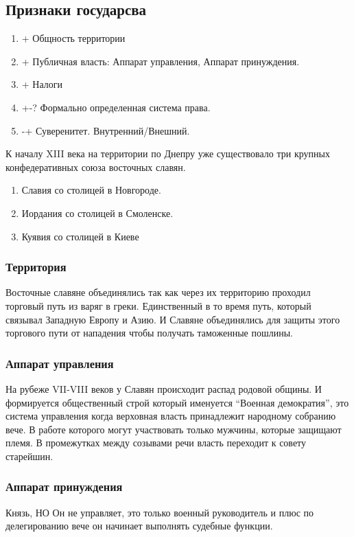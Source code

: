 \documentclass[a4paper]{article}
\begin{document}
\subsection{Признаки государсва}
\begin{enumerate}
    \item + Общность территории
    \item + Публичная власть: Аппарат управления, Аппарат принуждения.
    \item + Налоги
    \item +-? Формально определенная система права.
    \item -+ Суверенитет. Внутренний/Внешний.
\end{enumerate}

К началу XIII века на территории по Днепру уже существовало три крупных конфедеративных союза восточных славян. 
\begin{enumerate}
    \item Славия со столицей в Новгороде. 
    \item Иордания со столицей в Смоленске. 
    \item Куявия со столицей в Киеве
\end{enumerate}

\subsubsection{Территория}
Восточные славяне объединялись так как через их территорию проходил торговый путь из варяг в греки. Единственный в то время путь, который связывал Западную Европу и Азию. И Славяне объединялись для защиты этого торгового пути от нападения чтобы получать таможенные пошлины.

\subsubsection{Аппарат управления}
На рубеже VII-VIII веков у Славян происходит распад родовой общины. И формируется общественный строй который именуется ``Военная демократия'', это система управления когда верховная власть принадлежит народному собранию вече. В работе которого могут участвовать только мужчины, которые защищают племя. В промежутках между созывами речи власть переходит к совету старейшин.

\subsubsection{Аппарат принуждения}
Князь, НО Он не управляет, это только военный руководитель и плюс по делегированию вече он начинает выполнять судебные функции.
\end{document}
